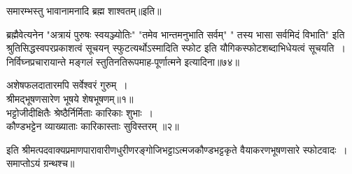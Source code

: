 {{{{\begin{center}
समारम्भस्तु भावानामनादि ब्रह्म शाश्वतम्॥इति॥\end{center}
 ब्रह्मैवेत्यनेन "अत्रायं पुरुषः स्वयञ्ज्योतिः" "तमेव भान्तमनुभाति सर्वम्" " तस्य भासा सर्वमिदं विभाति" इति श्रुतिसिद्धस्वपरप्रकाशत्वं सूचयन् स्फुटत्यर्थोऽस्मादिति स्फोट इति यौगिकस्फोटशब्दाभिधेयत्वं सूचयति~।
निर्विघ्नप्रचारायान्ते मङ्गलं स्तुतिनतिरूपमाह-पूर्णात्मने इत्यादिना॥७४॥
\begin{center} अशेषफलदातारमपि सर्वेश्वरं गुरुम्~।\\
श्रीमद्भूषणसारेण भूषये शेषभूषणम्॥१॥\\[10pt]
 भट्टोजीदीक्षितैः श्रेष्ठैर्निर्मिताः कारिकाः शुभाः~।\\
कौण्डभट्टेन व्याख्याताः कारिकास्ताः सुविस्तरम् ॥२॥\end{center}
इति श्रीमत्पदवाक्यप्रमाणपारावारीणधुरीणरङ्गोजिभट्टाऽत्मजकौण्डभट्टकृते वैयाकरणभूषणसारे स्फोटवादः~।
समाप्तोऽयं ग्रन्थश्च॥
}}}}
